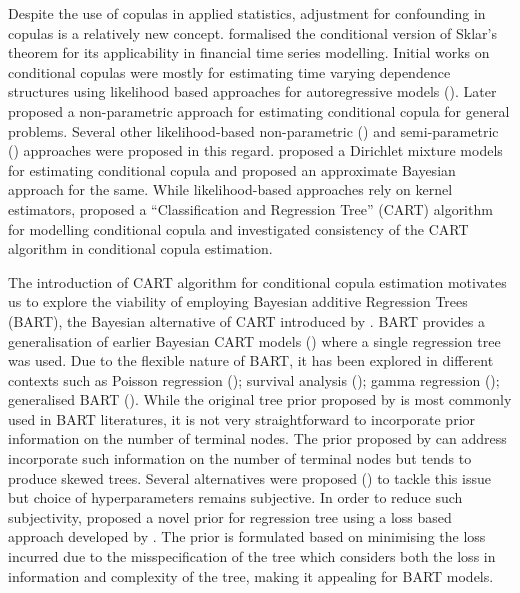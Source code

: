 \documentclass{amsart}
\begin{document}
Despite the use of copulas in applied statistics, adjustment for confounding in copulas is a relatively new concept. \citet{patton2006} formalised the conditional version of Sklar's theorem for its applicability in financial time series modelling. Initial works on conditional copulas were mostly for estimating time varying dependence structures using likelihood based approaches for autoregressive models (\citet{patton2006,JONDEAU2006827,BARTRAM20071461}). Later \citet{acar2010} proposed a non-parametric approach for estimating conditional copula for general problems. Several other likelihood-based non-parametric (\citet{GIJBELS20111919,Gijbels2012mult_cop}) and semi-parametric (\citet{ABEGAZ201243}) approaches were proposed in this regard. \citet{valle_cond_cop} proposed a Dirichlet mixture models for estimating conditional copula and \citet{GRAZIAN2022107417} proposed an approximate Bayesian approach for the same. While likelihood-based approaches rely on kernel estimators, \citet{BonacinaLopezThomas+2025} proposed a ``Classification and Regression Tree'' (CART) \cite{brei_CART} algorithm for modelling conditional copula and investigated consistency of the CART algorithm in conditional copula estimation.

The introduction of CART algorithm for conditional copula estimation motivates us to explore the viability of employing Bayesian additive Regression Trees (BART), the Bayesian alternative of CART introduced by \citet{chipman2010BART}. BART provides a generalisation of earlier Bayesian CART models (\citet{chipman98BCART,denison98BCART}) where a single regression tree was used. Due to the flexible nature of BART, it has been explored in different contexts such as Poisson regression (\citet{Murray03042021}); survival analysis (\citet{Sparapani_BART}); gamma regression (\citet{Linero_BART_gamma}); generalised BART (\citet{Linero02012025}). While the original tree prior proposed by \citet{chipman98BCART} is most commonly used in BART literatures, it is not very straightforward to incorporate prior information on the number of terminal nodes. The prior proposed by \citet{denison98BCART} can address incorporate such information on the number of terminal nodes but tends to produce skewed trees. Several alternatives were proposed (\citet{Wu_CART,rockova_BART,Linero_BART_VS}) to tackle this issue but choice of hyperparameters remains subjective. In order to reduce such subjectivity, \citet{serafini2024lossbasedpriortreetopologies} proposed a novel prior for regression tree using a loss based approach developed by \citet{villa_loss-prior}. The prior is formulated based on minimising the loss incurred due to the misspecification of the tree which considers both the loss in information and complexity of the tree, making it appealing for BART models.
\end{document}
